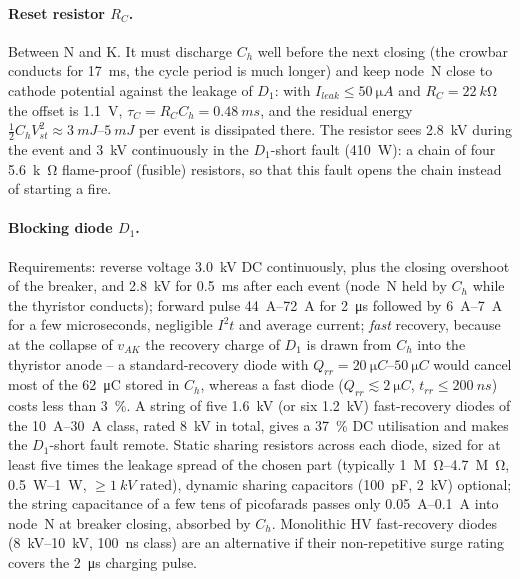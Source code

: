 \documentclass[11pt,a4paper]{article}
\begin{document}
\paragraph{Reset resistor $R_C$.} Between N and K. It must discharge $C_h$ well before the next
closing (the crowbar conducts for \SI{17}{ms}, the cycle period is much longer) and keep node~N
close to cathode potential against the leakage of $D_1$: with $I_{leak} \le \SI{50}{\micro A}$
and $R_C = \SI{22}{k\ohm}$ the offset is \SI{1.1}{V}, $\tau_C = R_C C_h = \SI{0.48}{ms}$, and the
residual energy $\tfrac12 C_h V_{st}^2 \approx \SIrange{3}{5}{mJ}$ per event is dissipated
there. The resistor sees \SI{2.8}{kV} during the event and \SI{3}{kV} continuously in the
$D_1$-short fault (\SI{410}{W}): a chain of four \SI{5.6}{k\ohm} flame-proof (fusible)
resistors, so that this fault opens the chain instead of starting a fire.

\paragraph{Blocking diode $D_1$.} Requirements: reverse voltage \SI{3.0}{kV} DC continuously,
plus the closing overshoot of the breaker, and \SI{2.8}{kV} for \SI{0.5}{ms} after each event
(node~N held by $C_h$ while the thyristor conducts); forward pulse \SIrange{44}{72}{A} for
\SI{2}{\micro s} followed by \SIrange{6}{7}{A} for a few microseconds, negligible $I^2t$ and
average current; \emph{fast} recovery, because at the collapse of $v_{AK}$ the recovery charge of
$D_1$ is drawn from $C_h$ into the thyristor anode -- a standard-recovery diode with
$Q_{rr} = \SIrange{20}{50}{\micro C}$ would cancel most of the \SI{62}{\micro C} stored in
$C_h$, whereas a fast diode ($Q_{rr} \lesssim \SI{2}{\micro C}$, $t_{rr} \le \SI{200}{ns}$) costs
less than \SI{3}{\percent}. A string of five \SI{1.6}{kV} (or six \SI{1.2}{kV}) fast-recovery
diodes of the \SIrange{10}{30}{A} class, rated \SI{8}{kV} in total, gives a \SI{37}{\percent}
DC utilisation and makes the $D_1$-short fault remote. Static sharing resistors across each
diode, sized for at least five times the leakage spread of the chosen part (typically
\SIrange{1}{4.7}{M\ohm}, \SIrange{0.5}{1}{W}, $\ge \SI{1}{kV}$ rated), dynamic sharing
capacitors (\SI{100}{pF}, \SI{2}{kV}) optional; the string capacitance of a few tens of
picofarads passes only \SIrange{0.05}{0.1}{A} into node~N at breaker closing, absorbed by $C_h$.
Monolithic HV fast-recovery diodes (\SIrange{8}{10}{kV}, \SI{100}{ns} class) are an alternative
if their non-repetitive surge rating covers the \SI{2}{\micro s} charging pulse.
\end{document}
